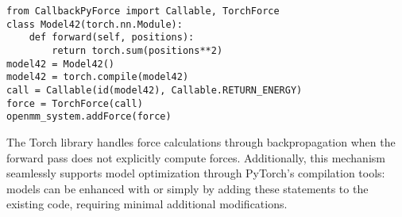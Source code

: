 \footnotesize\begin{verbatim}
from CallbackPyForce import Callable, TorchForce
class Model42(torch.nn.Module):
    def forward(self, positions):
        return torch.sum(positions**2)
model42 = Model42()
model42 = torch.compile(model42)
call = Callable(id(model42), Callable.RETURN_ENERGY)
force = TorchForce(call)
openmm_system.addForce(force)
\end{verbatim}\normalsize
The Torch library handles force calculations through backpropagation
when the forward pass does not explicitly compute forces.
Additionally, this mechanism seamlessly supports model optimization
through PyTorch's compilation tools:
models can be enhanced with \texttt{\torchjit} or \texttt{\torchcompile}
simply by adding these statements to the existing code,
requiring minimal additional modifications.
